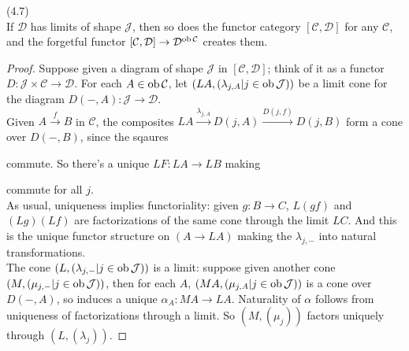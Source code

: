 \documentclass[a4paper]{article}
\begin{document}
\begin{lemma} (4.7)\\
    If $\mathcal{D}$ has limits of shape $\mathcal{J}$, then so does the functor category $[\mathcal{C},\mathcal{D}]$ for any $\mathcal{C}$, and the forgetful functor $[\mathcal{C},\mathcal{D}] \to \mathcal{D}^{\operatorname{ob} \mathcal{C}}$ creates them.
    \begin{proof}
        Suppose given a diagram of shape $\mathcal{J}$ in $[\mathcal{C},\mathcal{D}]$; think of it as a functor $D:\mathcal{J} \times \mathcal{C} \to \mathcal{D}$. For each $A \in \operatorname{ob}\mathcal{C}$, let $(LA,(\lambda_{j,A}|j \in \operatorname{ob} \mathcal{J}))$ be a limit cone for the diagram $D(-,A): \mathcal{J} \to \mathcal{D}$.\\
        Given $A \xrightarrow{f} B$ in $\mathcal{C}$, the composites $LA \xrightarrow{\lambda_{j,A}} D(j,A) \xrightarrow{D(j,f)} D(j,B)$ form a cone over $D(-,B)$, since the sqaures 
        commute. So there's a unique $LF:LA \to LB$ making
        commute for all $j$.\\
        As usual, uniqueness implies functoriality: given $g:B \to C$, $L(gf)$ and $(Lg)(Lf)$ are factorizations of the same cone through the limit $LC$. And this is the unique functor structure on $(A \to LA)$ making the $\lambda_{j,-}$ into natural transformations.\\
        The cone $(L,(\lambda_{j,-} | j \in \operatorname{ob}\mathcal{J}))$ is a limit: suppose given another cone $(M,(\mu_{j,-} | j \in \operatorname{ob}\mathcal{J}))$, then for each $A$, $(MA,(\mu_{j,A} | j \in \operatorname{ob}\mathcal{J}))$ is a cone over $D(-,A)$, so induces a unique $\alpha_A:MA \to LA$. Naturality of $\alpha$ follows from uniqueness of factorizations through a limit. So $(M,(\mu_j))$ factors uniquely through $(L,(\lambda_j))$.
    \end{proof}
\end{lemma}
\end{document}

